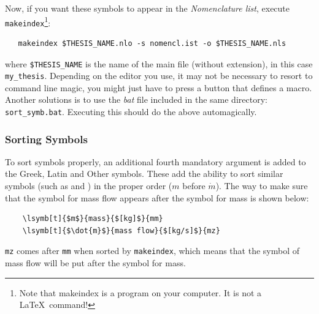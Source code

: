             Now, if you want these symbols to appear in the \emph{Nomenclature list}, execute \verb+makeindex+\footnote{Note that makeindex is a program on your computer. It is not a \LaTeX~command!}:
            \begin{small}
            \begin{verbatim}
   makeindex $THESIS_NAME.nlo -s nomencl.ist -o $THESIS_NAME.nls
            \end{verbatim}
            \end{small}
            where \verb+$THESIS_NAME+ is the name of the main file (without extension), in this case \verb+my_thesis+. Depending on the editor you use, it may not be necessary to resort to command line magic, you might just have to press a button that defines a macro. Another solutions is to use the \emph{bat} file included in the same directory: \verb+sort_symb.bat+. Executing this should do the above automagically.
            
            \subsubsection{Sorting Symbols}
                To sort symbols properly, an additional fourth mandatory argument is added to the Greek, Latin and Other symbols. These add the ability to sort similar symbols (such as  and ) in the proper order ($m$ before $\dot{m}$). The way to make sure that the symbol for mass flow appears after the symbol for mass is shown below:%
                \begin{small}%
                \begin{verbatim}
    \lsymb[t]{$m$}{mass}{$[kg]$}{mm}
    \lsymb[t]{$\dot{m}$}{mass flow}{$[kg/s]$}{mz}
                \end{verbatim}%
                \end{small}%
                \verb+mz+ comes after \verb+mm+ when sorted by \verb+makeindex+, which means that the symbol of mass flow will be put after the symbol for mass.
                
